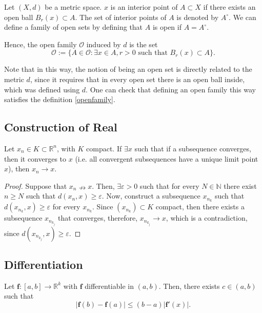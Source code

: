 \begin{definition}
	Let $(X,d)$ be a metric space. $x$ is an interior point of $A\subset X$
	if there exists an open ball $B_r(x)\subset A$.
	The set of interior points of $A$ is denoted by $A^\circ$.
	We can define a family of open sets by defining that
	$A$ is open if $A = A^\circ$.

	Hence, the open family $\mathcal O$ induced by $d$ is the set
	\begin{equation}
		\mathcal O := \{A \in \mathcal O : \exists x\in A, r>0 \text{ such that } B_r(x) \subset A\}.
	\end{equation}

	Note that in this way,
	the notion of being an open set is directly related to the metric $d$,
	since it requires that in every open set there is an open ball inside,
	which was defined using $d$.
	One can check that defining an open family this way satisfies the
	definition \ref{openfamily}.
\end{definition}

\subsection{Construction of Real}


\begin{theorem}
	Let $x_n \in K \subset \mathbb R^n$, with $K$ compact.
	If $\exists x$ such that if a subsequence
	converges, then it converges to $x$ (i.e.
	all convergent subsequences have a unique
	limit point $x$), then $x_n \to x$.
\end{theorem}
\begin{proof}
	Suppose that $x_n \nrightarrow x$. Then, $\exists \varepsilon > 0$ such
	that for every $N \in \mathbb N$ there exist $n \geq N$ such that
	$d(x_n , x) \geq \varepsilon$. Now, construct a subsequence
	$x_{n_k}$ such that $d(x_{n_k},x)\geq \varepsilon$ for every $x_{n_k}$.
	Since $(x_{n_k}) \subset K$ compact, then there exists a subsequence
	$x_{n_{k_j}}$ that converges, therefore, $x_{n_{k_j}} \to x$, which
	is a contradiction, since $d(x_{n_{k_j}},x) \geq \varepsilon$.
\end{proof}

\subsection{Differentiation}

\begin{theorem}
  Let $\bm f: [a,b] \to \mathbb R^k$ with $\bm f$ differentiable in $(a,b)$.
  Then, there exists $c \in (a,b)$ such that
  \begin{displaymath}
    \vert \bm f(b) - \bm f(a) \vert \leq (b-a)\vert \bm f'(x) \vert.
  \end{displaymath}
  \label{thm:almosttvm}
\end{theorem}
